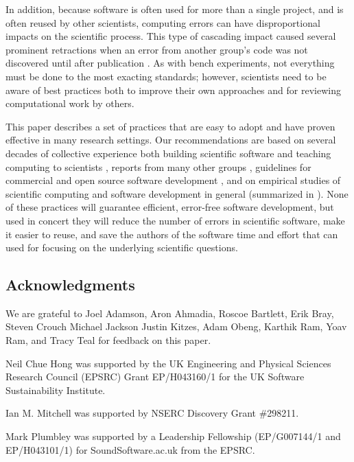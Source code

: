 \documentclass{article}
\begin{document}
In addition, because software is often used for more than a single
project, and is often reused by other scientists, computing errors can
have disproportional impacts on the scientific process. This type of
cascading impact caused several prominent retractions when an error
from another group's code was not discovered until after publication
\cite{merali2010}.  As with bench experiments, not everything must be
done to the most exacting standards; however, scientists need to be
aware of best practices both to improve their own approaches and for
reviewing computational work by others.

This paper describes a set of practices that are easy to adopt and
have proven effective in many research settings.  Our recommendations
are based on several decades of collective experience both building
scientific software and teaching computing to scientists
\cite{aranda2012,wilson2006b}, reports from many other groups
\cite{heroux2009,kane2003,kane2006,killcoyne2009,matthews2008,pitt-francis2008,pouillon2010},
guidelines for commercial and open source software development
\cite{spolsky2000,fogel2005}, and on empirical studies of scientific
computing \cite{carver2007,kelly2009,segal2005,segal2008a} and
software development in general (summarized in \cite{oram2010}). None
of these practices will guarantee efficient, error-free software
development, but used in concert they will reduce the number of errors
in scientific software, make it easier to reuse, and save the authors
of the software time and effort that can used for focusing on the
underlying scientific questions.

\subsection*{Acknowledgments}

We are grateful to
Joel Adamson,
Aron Ahmadia,
Roscoe Bartlett,
Erik Bray,
Steven Crouch
Michael Jackson
Justin Kitzes,
Adam Obeng,
Karthik Ram,
Yoav Ram,
and Tracy Teal
for feedback on this paper.

Neil Chue Hong was supported by the UK Engineering and Physical
Sciences Research Council (EPSRC) Grant EP/H043160/1 for the UK
Software Sustainability Institute.

Ian M. Mitchell was supported by NSERC Discovery Grant \#298211.

Mark Plumbley was supported by a Leadership Fellowship (EP/G007144/1
and EP/H043101/1) for SoundSoftware.ac.uk from the EPSRC.
\end{document}
